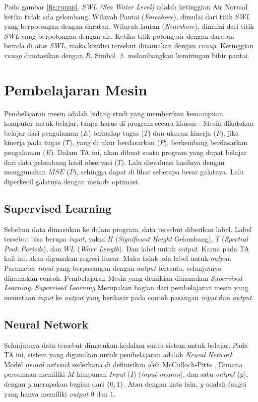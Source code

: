     Pada gambar \ref{fig:runup}, \emph{SWL (Sea Water Level)} adalah ketinggian Air Normal ketika tidak ada gelombang. Wilayah Pantai (\emph{Foreshore}), dimulai dari titik \emph{SWL} yang berpotongan dengan daratan. Wilayah lautan (\emph{Nearshore}), dimulai dari titik \emph{SWL} yang berpotongan dengan air. Ketika titik potong air dengan daratan berada di atas \emph{SWL}, maka kondisi tersebut dinamakan dengan \emph{runup}. Ketinggian \emph{runup} dinotasikan dengan $R$. Simbol $\upbeta$ melambangkan kemiringan bibir pantai.

\section{Pembelajaran Mesin}
    Pembelajaran mesin adalah bidang studi yang memberikan kemampuan komputer untuk belajar, tanpa harus di program secara khusus \cite{arthur_l_samuel_1959}. Mesin dikatakan belajar dari pengalaman ($E$) terhadap tugas ($T$) dan ukuran kinerja ($P$), jika kinerja pada tugas ($T$), yang di ukur berdasarkan ($P$), berkembang berdasarkan pengalaman ($E$). Dalam TA ini, akan dibuat suatu program yang dapat belajar dari data gelombang hasil observasi ($T$). Lalu dievaluasi hasilnya dengan menggunakan $MSE$ ($P$), sehingga dapat di lihat seberapa besar galatnya. Lalu diperkecil galatnya dengan metode optimasi.

\subsection{Supervised Learning}
    Sebelum data dimasukan ke dalam program, data tersebut diberikan label. Label tersebut bisa berupa \emph{input}, yakni $H$ (\emph{Significant Height} Gelombang), $T$ (\emph{Spectral Peak Periods}), dan $WL$ (\emph{Wave Length}). Dan label untuk \emph{output}. Karna pada TA kali ini, akan digunakan regresi linear. Maka tidak ada label untuk \emph{output}. Parameter \emph{input} yang berpasangan dengan \emph{output} tertentu, selanjutnya dinamakan contoh. Pembelajaran Mesin yang demikian dinamakan \emph{Supervised Learning}. \emph{Supervised Learning} Merupakan bagian dari pembelajaran mesin yang memetaan \emph{input} ke \emph{output} yang berdasar pada contoh pasangan \emph{input} dan \emph{output}\cite{AIPeterNorvig}. 

\subsection{Neural Network}
    Selanjutnya data tersebut dimasukan kedalam suatu sistem untuk belajar. Pada TA ini, sistem yang digunakan untuk pembelajaran adalah \emph{Neural Network}.
    Model \emph{neural network} sederhana di definisikan oleh McCulloch-Pitts \cite{McCulloch1943}. Dimana persamaan memiliki $M$ himpunan \emph{Input} ($I$) (\emph{input neuron}), dan satu \emph{output} ($y$), dengan $y$ merupakan bagian dari $\{0,1\}$. Atau dengan kata lain, $y$ adalah fungsi yang hanya memiliki \emph{output} $0$ dan $1$.

